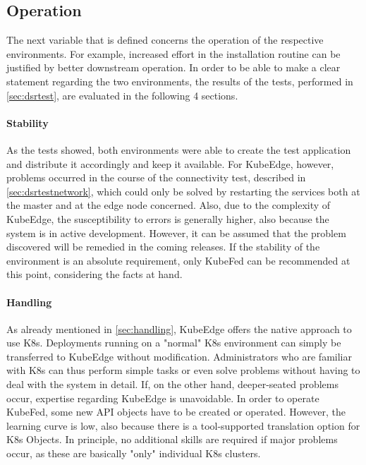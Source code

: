 \documentclass[MIC,Master,english]{twbook}%
\begin{document}
\subsection{Operation}
\label{sec:catops}
The next variable that is defined concerns the operation of the respective environments. For example, increased effort in the installation routine can be justified by better downstream operation. In order to be able to make a clear statement regarding the two environments, the results of the tests, performed in \autoref{sec:dsrtest}, are evaluated in the following 4 sections.

\paragraph{Stability} As the tests showed, both environments were able to create the test application and distribute it accordingly and keep it available. For KubeEdge, however, problems occurred in the course of the connectivity test, described in \autoref{sec:dsrtestnetwork}, which could only be solved by restarting the services both at the master and at the edge node concerned. Also, due to the complexity of KubeEdge, the susceptibility to errors is generally higher, also because the system is in active development. However, it can be assumed that the problem discovered will be remedied in the coming releases. If the stability of the environment is an absolute requirement, only KubeFed can be recommended at this point, considering the facts at hand.

\paragraph{Handling} As already mentioned in \autoref{sec:handling}, KubeEdge offers the native approach to use K8s. Deployments running on a "normal" \ac{K8s} environment can simply be transferred to KubeEdge without modification. Administrators who are familiar with K8s can thus perform simple tasks or even solve problems without having to deal with the system in detail. If, on the other hand, deeper-seated problems occur, expertise regarding KubeEdge is unavoidable. In order to operate KubeFed, some new API objects have to be created or operated. However, the learning curve is low, also because there is a tool-supported translation option for \ac{K8s} Objects. In principle, no additional skills are required if major problems occur, as these are basically "only" individual \ac{K8s} clusters.
\end{document}
